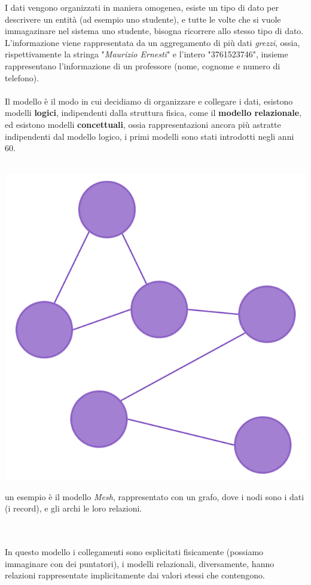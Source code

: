 \documentclass[12pt, letterpaper]{article}
\begin{document}
I dati vengono organizzati in maniera omogenea, esiste un tipo di dato per descrivere un entità (ad esempio uno studente),
e tutte le volte che si vuole immagazinare nel sistema uno studente, bisogna ricorrere allo stesso tipo di dato.
L'informazione viene rappresentata da un aggregamento di più dati \textit{grezzi}, ossia, rispettivamente la stringa
 "\textit{Maurizio Ernesti}" e l'intero "3761523746", insieme rappresentano l'informazione di un 
 professore (nome, cognome e numero di telefono).\\\\
 Il modello è il modo in cui decidiamo di organizzare e collegare i dati, esistono modelli \textbf{logici}, 
 indipendenti dalla struttura fisica, come il \textbf{modello relazionale}, ed esistono modelli \textbf{concettuali},
 ossia rappresentazioni ancora più astratte indipendenti dal modello logico, i primi modelli sono stati introdotti
 negli anni 60.
 \\\\
 \begin{minipage}{0.16\textwidth}
    \includegraphics[width=\linewidth]{images/GrafoViola.png}
    \end{minipage}
    \begin{minipage}{0.8\textwidth}\raggedright
        un esempio è il modello \textit{Mesh}, rappresentato con un grafo, dove i nodi sono i dati (i record), e
        gli archi le loro relazioni.
    \end{minipage}
    \noindent
    \\\\
In questo modello i collegamenti sono esplicitati fisicamente (possiamo immaginare con dei puntatori), i modelli
relazionali, diversamente, hanno relazioni rappresentate implicitamente dai valori stessi che contengono.
\\
\end{document}
